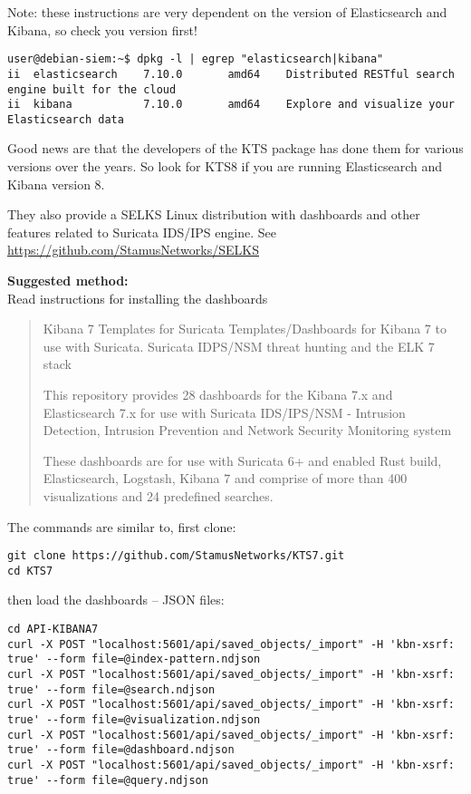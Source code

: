 \documentclass[a4paper,11pt,notitlepage]{report}
\begin{document}
Note: these instructions are very dependent on the version of Elasticsearch and Kibana, so check you version first!
\begin{verbatim}
user@debian-siem:~$ dpkg -l | egrep "elasticsearch|kibana"
ii  elasticsearch    7.10.0       amd64    Distributed RESTful search engine built for the cloud
ii  kibana           7.10.0       amd64    Explore and visualize your Elasticsearch data
\end{verbatim}

Good news are that the developers of the KTS package has done them for various versions over the years. So look for KTS8 if you are running Elasticsearch and Kibana version 8.

They also provide a SELKS Linux distribution with dashboards and other features related to Suricata IDS/IPS engine. See \url{https://github.com/StamusNetworks/SELKS}

{\bf Suggested method:}\\
Read instructions for installing the dashboards\\

\begin{quote}
Kibana 7 Templates for Suricata
Templates/Dashboards for Kibana 7 to use with Suricata. Suricata IDPS/NSM threat hunting and the ELK 7 stack

This repository provides 28 dashboards for the Kibana 7.x and Elasticsearch 7.x for use with Suricata IDS/IPS/NSM - Intrusion Detection, Intrusion Prevention and Network Security Monitoring system

These dashboards are for use with Suricata 6+ and enabled Rust build, Elasticsearch, Logstash, Kibana 7 and comprise of more than 400 visualizations and 24 predefined searches.
\end{quote}

The commands are similar to, first clone:
\begin{verbatim}
git clone https://github.com/StamusNetworks/KTS7.git
cd KTS7
\end{verbatim}

\eject
then load the dashboards -- JSON files:
\begin{verbatim}
cd API-KIBANA7
curl -X POST "localhost:5601/api/saved_objects/_import" -H 'kbn-xsrf: true' --form file=@index-pattern.ndjson
curl -X POST "localhost:5601/api/saved_objects/_import" -H 'kbn-xsrf: true' --form file=@search.ndjson
curl -X POST "localhost:5601/api/saved_objects/_import" -H 'kbn-xsrf: true' --form file=@visualization.ndjson
curl -X POST "localhost:5601/api/saved_objects/_import" -H 'kbn-xsrf: true' --form file=@dashboard.ndjson
curl -X POST "localhost:5601/api/saved_objects/_import" -H 'kbn-xsrf: true' --form file=@query.ndjson
\end{verbatim}
\end{document}
